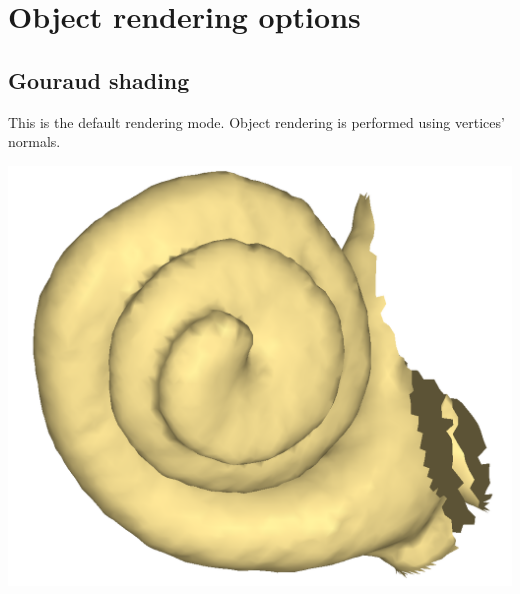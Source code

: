 \section{Object rendering options}

\noindent
\begin{minipage}{0.55\textwidth}



\subsection{Gouraud shading}
This is the default rendering mode. Object rendering is performed using vertices' normals.

\end{minipage}  
 \begin{minipage}{0.45\textwidth}\centering




 \includegraphics[scale=0.1]{images/Viewing_options/Normal_gouraud.png}

 \end{minipage} 
\noindent


